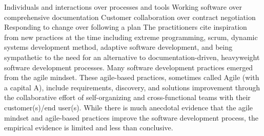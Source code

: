 Individuals and interactions over processes and tools
Working software over comprehensive documentation
Customer collaboration over contract negotiation
Responding to change over following a plan
The practitioners cite inspiration from new practices at the time including extreme programming, scrum, dynamic systems development method, adaptive software development, and being sympathetic to the need for an alternative to documentation-driven, heavyweight software development processes.
Many software development practices emerged from the agile mindset. These agile-based practices, sometimes called Agile (with a capital A), include requirements, discovery, and solutions improvement through the collaborative effort of self-organizing and cross-functional teams with their customer(s)/end user(s).
While there is much anecdotal evidence that the agile mindset and agile-based practices improve the software development process, the empirical evidence is limited and less than conclusive.



